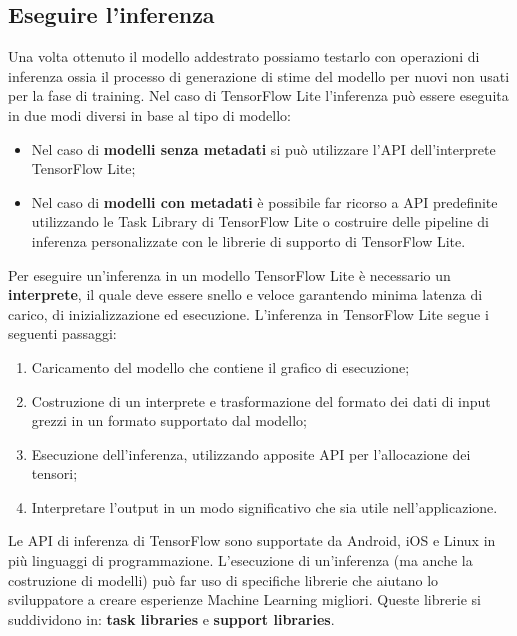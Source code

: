 \subsection{Eseguire l'inferenza}
Una volta ottenuto il modello addestrato possiamo testarlo con operazioni di inferenza ossia il processo di generazione di stime del modello per nuovi
non usati per la fase di training. Nel caso di TensorFlow Lite l’inferenza può essere eseguita in due modi diversi in base al tipo di modello:
\begin{itemize}
    \item Nel caso di \textbf{modelli senza metadati} si può utilizzare l’API dell’interprete TensorFlow Lite;
    \item Nel caso di \textbf{modelli con metadati} è possibile far ricorso a API predefinite utilizzando le Task Library di TensorFlow Lite o
    costruire delle pipeline di inferenza personalizzate con le librerie di supporto di TensorFlow Lite.
\end{itemize}
Per eseguire un’inferenza in un modello TensorFlow Lite è necessario un \textbf{interprete}, il quale deve essere snello e veloce garantendo minima
latenza di carico, di inizializzazione ed esecuzione. L’inferenza in TensorFlow Lite segue i seguenti passaggi:
\begin{enumerate}
    \item Caricamento del modello che contiene il grafico di esecuzione;
    \item Costruzione di un interprete e trasformazione del formato dei dati di input grezzi in un formato supportato dal modello;
    \item Esecuzione dell’inferenza, utilizzando apposite API per l’allocazione dei tensori;
    \item Interpretare l’output in un modo significativo che sia utile nell’applicazione.
\end{enumerate}
Le API di inferenza di TensorFlow sono supportate da Android, iOS e Linux in più linguaggi di programmazione. L’esecuzione di un’inferenza (ma anche
la costruzione di modelli) può far uso di specifiche librerie che aiutano lo sviluppatore a creare esperienze Machine Learning migliori. 
Queste librerie si suddividono in: \textbf{task libraries} e \textbf{support libraries}.

